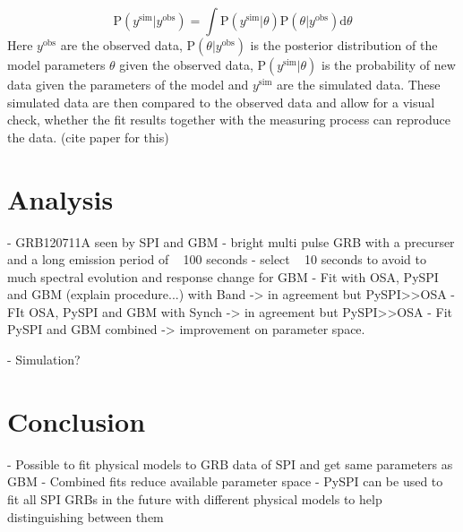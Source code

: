 \documentclass[twocolumn]{article}%
\begin{document}
\begin{equation}
  \textrm{P}(y^{\textrm{sim}}|y^{\textrm{obs}}) = \int \textrm{P}(y^{\textrm{sim}}|\theta) \textrm{P}(\theta|y^{\textrm{obs}}) \mathrm{d}\theta
\end{equation}
\noindent
Here $y^{\textrm{obs}}$ are the observed data, $\textrm{P}(\theta|y^{\textrm{obs}})$ is the posterior distribution of the model parameters $\theta$ given the observed data, $\textrm{P}(y^{\textrm{sim}}|\theta)$ is the probability of new data given the parameters of the model and $y^{\textrm{sim}}$ are the simulated data. These simulated data are then compared to the observed data and allow for a visual check, whether the fit results together with the measuring process can reproduce the data. (cite paper for this)
\section{Analysis}

- GRB120711A seen by SPI and GBM
- bright multi pulse GRB with a precurser and a long emission period of ~ 100 seconds
- select ~ 10 seconds to avoid to much spectral evolution and response change for GBM
- Fit with OSA, PySPI and GBM (explain procedure...) with Band -> in agreement but PySPI>>OSA
- FIt OSA, PySPI and GBM with Synch -> in agreement but PySPI>>OSA
- Fit PySPI and GBM combined -> improvement on parameter space.

- Simulation?

\section{Conclusion}

- Possible to fit physical models to GRB data of SPI and get same parameters as GBM
- Combined fits reduce available parameter space
- PySPI can be used to fit all SPI GRBs in the future with different physical models to help distinguishing between them
\end{document}
